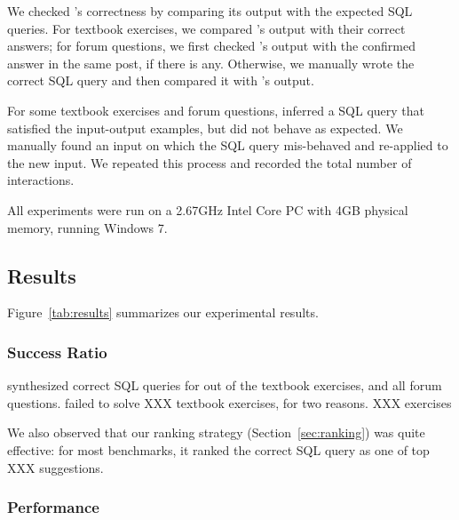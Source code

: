 We checked \ourtool's correctness by comparing its
output with the expected SQL queries.
For textbook exercises, we compared \ourtool's output with
their correct answers; for forum questions, we first
checked \ourtool's output with the confirmed answer
in the same post, if there is any. Otherwise, we
manually wrote the correct SQL query and then
compared it with \ourtool's output.

For some textbook exercises and forum questions,
\ourtool inferred a SQL query that satisfied the input-output
examples, but did not behave as expected.
We manually found an input on which the
SQL query mis-behaved and re-applied \ourtool to the new input. We
repeated this process and recorded the total number of
interactions.


All experiments were run on a 2.67GHz Intel Core PC
with 4GB physical memory, running Windows 7.






\subsection{Results}

Figure~\ref{tab:results} summarizes our experimental results.

\subsubsection{Success Ratio}
\label{sec:ratio}


\ourtool synthesized correct SQL queries for \solexnum  out of
\exnum the textbook exercises, and 
all \pnum forum questions.
\ourtool failed to solve XXX textbook exercises, for
two reasons. XXX exercises 

We also observed that our ranking strategy (Section~\ref{sec:ranking})
was quite effective: for most benchmarks, it ranked the correct
SQL query as one of top XXX suggestions.

%

\subsubsection{Performance}
\label{sec:performance}

